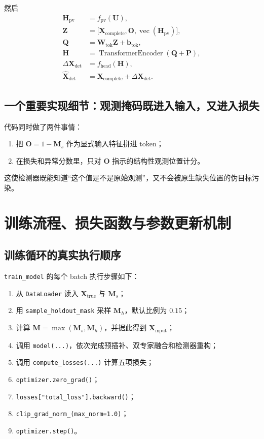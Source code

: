 \documentclass[UTF8]{ctexart}
\newcommand{\vect}[1]{\operatorname{vec}\!\left(#1\right)}
\begin{document}
然后
\begin{align}
    \bm{H}_{\text{pv}} &= f_{\text{pv}}(\bm{U}), \\
    \bm{Z} &= \Big[\bm{X}_{\text{complete}}, \bm{O}, \vect{\bm{H}_{\text{pv}}}\Big], \\
    \bm{Q} &= \bm{W}_{\text{tok}}\bm{Z} + \bm{b}_{\text{tok}}, \\
    \bm{H} &= \operatorname{TransformerEncoder}(\bm{Q} + \bm{P}), \\
    \Delta\bm{X}_{\text{det}} &= f_{\text{head}}(\bm{H}), \\
    \widehat{\bm{X}}_{\text{det}} &= \bm{X}_{\text{complete}} + \Delta\bm{X}_{\text{det}}.
\end{align}

\subsection{一个重要实现细节：观测掩码既进入输入，又进入损失}

代码同时做了两件事情：
\begin{enumerate}
    \item 把 \(\bm{O}=1-\bm{M}_s\) 作为显式输入特征拼进 token；
    \item 在损失和异常分数里，只对 \(\bm{O}\) 指示的结构性观测位置计分。
\end{enumerate}

这使检测器既能知道“这个值是不是原始观测”，又不会被原生缺失位置的伪目标污染。

\section{训练流程、损失函数与参数更新机制}

\subsection{训练循环的真实执行顺序}

\texttt{train\_model} 的每个 batch 执行步骤如下：
\begin{enumerate}
    \item 从 \texttt{DataLoader} 读入 \(\bm{X}_{\text{true}}\) 与 \(\bm{M}_s\)；
    \item 用 \texttt{sample\_holdout\_mask} 采样 \(\bm{M}_h\)，默认比例为 \(0.15\)；
    \item 计算 \(\bm{M}=\max(\bm{M}_s,\bm{M}_h)\)，并据此得到 \(\bm{X}_{\text{input}}\)；
    \item 调用 \texttt{model(...)}，依次完成预插补、双专家融合和检测器重构；
    \item 调用 \texttt{compute\_losses(...)} 计算五项损失；
    \item \texttt{optimizer.zero\_grad()}；
    \item \texttt{losses["total\_loss"].backward()}；
    \item \texttt{clip\_grad\_norm\_(max\_norm=1.0)}；
    \item \texttt{optimizer.step()}。
\end{enumerate}
\end{document}
